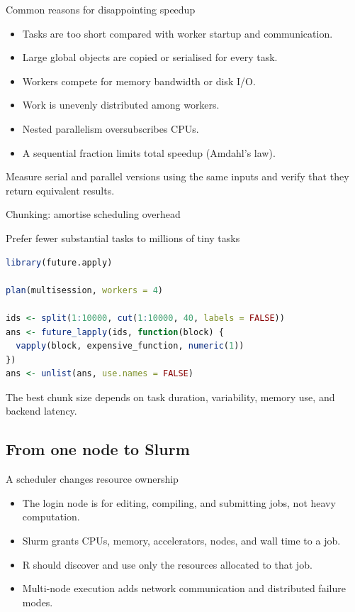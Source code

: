 \begin{frame}{Common reasons for disappointing speedup}
\begin{itemize}
  \item Tasks are too short compared with worker startup and communication.
  \item Large global objects are copied or serialised for every task.
  \item Workers compete for memory bandwidth or disk I/O.
  \item Work is unevenly distributed among workers.
  \item Nested parallelism oversubscribes CPUs.
  \item A sequential fraction limits total speedup (Amdahl's law).
\end{itemize}
\vspace{0.2cm}
Measure serial and parallel versions using the same inputs and verify that they return equivalent results.
\end{frame}

\begin{frame}[fragile]{Chunking: amortise scheduling overhead}
\begin{block}{Prefer fewer substantial tasks to millions of tiny tasks}
\begin{lstlisting}[language=R]
library(future.apply)

plan(multisession, workers = 4)

ids <- split(1:10000, cut(1:10000, 40, labels = FALSE))
ans <- future_lapply(ids, function(block) {
  vapply(block, expensive_function, numeric(1))
})
ans <- unlist(ans, use.names = FALSE)
\end{lstlisting}
\end{block}
The best chunk size depends on task duration, variability, memory use, and backend latency.
\end{frame}

\subsection{From one node to Slurm}

\begin{frame}{A scheduler changes resource ownership}
\begin{itemize}
  \item The login node is for editing, compiling, and submitting jobs, not heavy computation.
  \item Slurm grants CPUs, memory, accelerators, nodes, and wall time to a job.
  \item R should discover and use only the resources allocated to that job.
  \item Multi-node execution adds network communication and distributed failure modes.
\end{itemize}
\end{frame}

